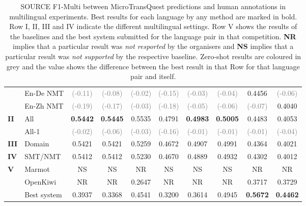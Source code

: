 \begin{table}[t]
\begin{center}
{\begin{tabular}{l l c c c c c c c c}
				& En-De NMT & \textcolor{gray}{(-0.11)}  & \textcolor{gray}{(-0.08)} & \textcolor{gray}{(-0.02)} & \textcolor{gray}{(-0.15)} & \textcolor{gray}{(-0.03)}  & \textcolor{gray}{(-0.04)} & 0.4456 &  \textcolor{gray}{(-0.06)} \\
				& En-Zh NMT & \textcolor{gray}{(-0.19)}  & \textcolor{gray}{(-0.17)} & \textcolor{gray}{(-0.03)} & \textcolor{gray}{(-0.18)} & \textcolor{gray}{(-0.05)}  & \textcolor{gray}{(-0.06)} & \textcolor{gray}{(-0.07)} & 0.4040 \\
				\midrule
				\multirow{2}{*}{\bf II} & All & \textbf{0.5442}  & \textbf{0.5445} & 0.5535 & 0.4791 & \textbf{0.4983} & \textbf{0.5005} & 0.4483 & 0.4053\\
				& All-1 & \textcolor{gray}{(-0.02)}  & \textcolor{gray}{(-0.06)} & \textcolor{gray}{(-0.03)} & \textcolor{gray}{(-0.16)} & \textcolor{gray}{(-0.01)} & \textcolor{gray}{(-0.01)} & \textcolor{gray}{(-0.01)} & \textcolor{gray}{(-0.04)} \\
				\midrule
				\multirow{1}{*}{\bf III} & Domain & 0.5421  & 0.5421 & 0.5259 & 0.4672 & 0.4907 & 0.4991  & 0.4364 &  0.4021 \\
				\midrule
				\multirow{1}{*}{\bf IV} & SMT/NMT & 0.5412   & 0.5412 & 0.5230 & 0.4670 & 0.4889 & 0.4932 & 0.4302 & 0.4012 \\
				\midrule
				\multirow{3}{*}{\bf V} & Marmot & NS  & NS & NR & NS & NS & NS & NR & NR \\
				& OpenKiwi & NR  & NR & 0.2647 & NR & NR & NR & 0.3717 & 0.3729 \\
				& Best system & 0.3937  & 0.3368  & 0.4541 & 0.3200 & 0.3614 & 0.4945 & \textbf{0.5672} & \textbf{0.4462} \\
				\bottomrule
			\end{tabular}
		}
	\end{center}
	\caption[Multilingual Source F1-Multi between MicroTransQuest predictions and human annotations]{SOURCE F1-Multi between MicroTransQuest predictions and human annotations in multilingual experiments. Best results for each language by any method are marked in bold. Row I, II, III and IV indicate the different multilingual settings. Row V shows the results of the baselines and the best system submitted for the language pair in that competition. \textbf{NR} implies that a particular result was \textit{not resported} by the organisers and \textbf{NS} implies that a particular result was \textit{not supported} by the respective baseline. Zero-shot results are coloured in grey and the value shows the difference between the best result in that Row for that language pair and itself.} 
	\label{tab:multilingual_source_prediction}
\end{table}


